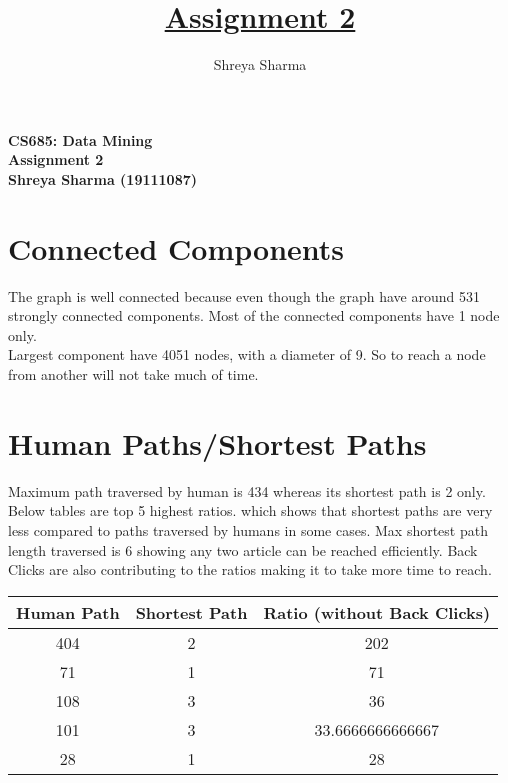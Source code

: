 \documentclass[12pt]{article}
\title{\underline{Assignment 2} \\}
\author{Shreya Sharma}
\begin{document}


\begin{center}
    
\vspace{1 cm}

\textbf{\Large{CS685: Data Mining} \\ \vspace{0.5 cm}\Large{Assignment 2} \\\vspace{0.5 cm}\Large{Shreya Sharma (19111087)}}\\
\vspace{1 cm} 
\end{center}
\section{Connected Components}
The graph is well connected because even though the graph 
have around 531 strongly connected components. Most of the connected components have 1 node only. \\ 

Largest component have 4051 nodes, with a diameter of 9. So to reach a node from another will not take much of time.

\section{Human Paths/Shortest Paths}

Maximum path traversed by human is 434 whereas its shortest path is 2 only. Below tables are top 5 highest ratios. which shows that shortest paths are very less compared to paths traversed by humans in some cases. Max shortest path length traversed is 6 showing any two article can be reached efficiently. Back Clicks are also contributing to the ratios making it to take more time to reach.

\begin{center}
 \begin{tabular}{||c c c||} 
 \hline
 Human Path & Shortest Path & Ratio (without Back Clicks) \\ [0.5ex] 
\hline\hline
404 & 2 & 202\\
\hline
71	& 1	& 71\\
\hline
108	& 3	& 36\\
\hline
101	& 3	& 33.6666666666667\\
\hline
28	& 1	& 28\\
\hline
\end{tabular}\\ \\
\end{center}
\end{document}
